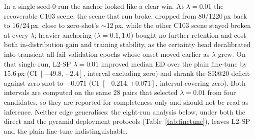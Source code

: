 \documentclass[fleqn,10pt]{wlscirep}
\begin{document}
In a single seed-0 run the anchor looked like a clear win. At $\lambda=0.01$ the recoverable C103 scene, the scene that run broke, dropped from 80/1220\,px back to 16/24\,px, close to zero-shot's $\sim$12\,px, while the other C103 scene stayed broken at every $\lambda$; heavier anchoring ($\lambda=0.1,1.0$) bought no further retention and cost both in-distribution gain and training stability, as the certainty head decalibrated into transient all-fail validation epochs whose onset moved earlier as $\lambda$ grew. On that single run, L2-SP $\lambda=0.01$ improved median ED over the plain fine-tune by 15.6\,px (CI $[-49.8,-2.4]$, interval excluding zero) and shrank the SR@20 deficit against zero-shot to $-0.071$ (CI $[-0.214,+0.071]$, interval covering zero). Both intervals are computed on the same 28 pairs that selected $\lambda=0.01$ from four candidates, so they are reported for completeness only and should not be read as inference. Neither edge generalises: the eight-run analysis below, under both the direct and the pyramid deployment protocols (Table~\ref{tab:finetune}), leaves L2-SP and the plain fine-tune indistinguishable.
\end{document}
